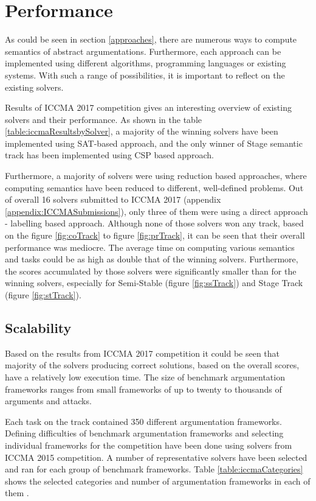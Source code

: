 \section{Performance}
As could be seen in section \ref{approaches}, there are numerous ways to compute semantics of abstract argumentations. Furthermore, each approach can be implemented using different algorithms, programming languages or existing systems. With such a range of possibilities, it is important to reflect on the existing solvers.

Results of ICCMA 2017 competition \citep{iccmaResults} gives an interesting overview of existing solvers and their performance. As shown in the table \ref{table:iccmaResultsbySolver}, a majority of the winning solvers have been implemented using SAT-based approach, and the only winner of Stage semantic track has been implemented using CSP based approach. 

Furthermore, a majority of solvers were using reduction based approaches, where computing semantics have been reduced to different, well-defined problems. Out of overall 16 solvers submitted to ICCMA 2017 (appendix \ref{appendix:ICCMASubmissions}), only three of them were using a direct approach - labelling based approach. Although none of those solvers won any track, based on the figure \ref{fig:coTrack} to figure \ref{fig:prTrack}, it can be seen that their overall performance was mediocre. The average time on computing various semantics and tasks could be as high as double that of the winning solvers. Furthermore, the scores accumulated by those solvers were significantly smaller than for the winning solvers, especially for Semi-Stable (figure \ref{fig:ssTrack}) and Stage Track (figure \ref{fig:stTrack}).


\subsection{Scalability}
Based on the results from ICCMA 2017 competition it could be seen that majority of the solvers producing correct solutions, based on the overall scores, have a relatively low execution time. The size of benchmark argumentation frameworks ranges from small frameworks of up to twenty to thousands of arguments and attacks.

Each task on the track contained 350 different argumentation frameworks. Defining difficulties of benchmark argumentation frameworks and selecting individual frameworks for the competition have been done using solvers from ICCMA 2015 competition. A number of representative solvers have been selected and ran for each group of benchmark frameworks. Table \ref{table:iccmaCategories} shows the selected categories and number of argumentation frameworks in each of them \citep{results_sildes}.

